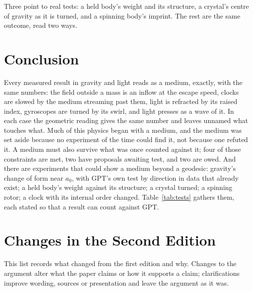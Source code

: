 \documentclass[11pt,a4paper]{article}
\begin{document}
 Three point to real tests: a held body's weight and its structure, a crystal's centre of gravity as it is turned, and a spinning body's imprint. The rest are the same outcome, read two ways.

\section*{Conclusion}

Every measured result in gravity and light reads as a medium, exactly, with the same numbers: the field outside a mass is an inflow at the escape speed, clocks are slowed by the medium streaming past them, light is refracted by its raised index, gyroscopes are turned by its swirl, and light presses as a wave of it. In each case the geometric reading gives the same number and leaves unnamed what touches what. Much of this physics began with a medium, and the medium was set aside because no experiment of the time could find it, not because one refuted it. A medium must also survive what was once counted against it; four of those constraints are met, two have proposals awaiting test, and two are owed. And there are experiments that could show a medium beyond a geodesic: gravity's change of form near $a_0$, with GPT's own test by direction in data that already exist; a held body's weight against its structure; a crystal turned; a spinning rotor; a clock with its internal order changed. Table~\ref{tab:tests} gathers them, each stated so that a result can count against GPT.

\clearpage
\section*{Changes in the Second Edition}

This list records what changed from the first edition and why. Changes to the argument alter what the paper claims or how it supports a claim; clarifications improve wording, sources or presentation and leave the argument as it was.
\end{document}
